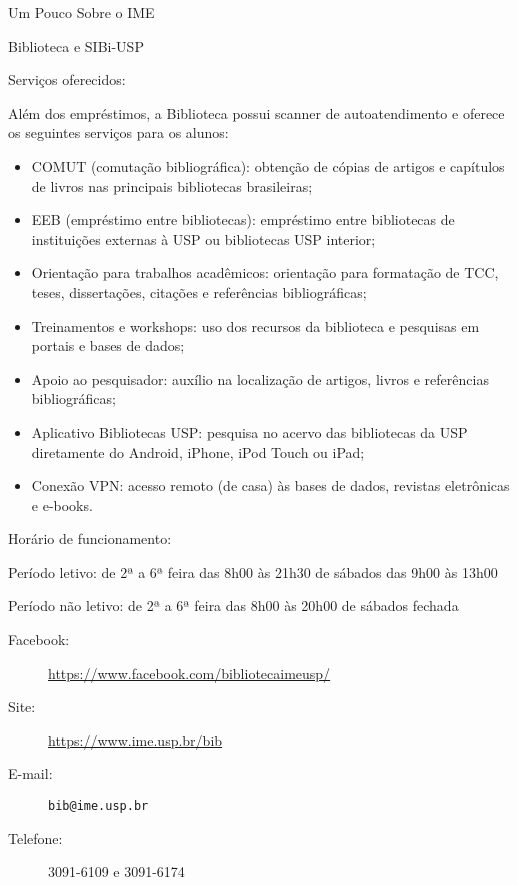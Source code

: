 \begin{secao}{Um Pouco Sobre o IME}
\begin{subsecao}{Biblioteca e SIBi-USP}
\begin{subsubsecao}{Serviços oferecidos:}

Além dos empréstimos, a Biblioteca possui scanner de autoatendimento e oferece os seguintes serviços para os alunos:
\begin{itemize}
    \item COMUT (comutação bibliográfica): obtenção de cópias de artigos e capítulos de livros nas principais bibliotecas brasileiras; 
    \item EEB (empréstimo entre bibliotecas): empréstimo entre bibliotecas de instituições externas à USP ou bibliotecas USP interior;
    \item Orientação para trabalhos acadêmicos: orientação para formatação de TCC, teses, dissertações, citações e referências bibliográficas;
    \item Treinamentos e workshops: uso dos recursos da biblioteca e pesquisas em portais e bases de dados;
    \item Apoio ao pesquisador: auxílio na localização de artigos, livros e referências bibliográficas;
    \item Aplicativo Bibliotecas USP: pesquisa no acervo das bibliotecas da USP diretamente do Android, iPhone, iPod Touch ou iPad; 
    \item Conexão VPN: acesso remoto (de casa) às bases de dados, revistas eletrônicas e e-books.
\end{itemize}
\end{subsubsecao}

\begin{subsubsecao}{Horário de funcionamento:}

Período letivo: de 2ª a 6ª feira das 8h00 às 21h30 \newline
\phantom{Período letivo: }de sábados das 9h00 às 13h00

Período não letivo: de 2ª a 6ª feira das 8h00 às 20h00 \newline
\phantom{Período não letivo: }de sábados fechada 
\end{subsubsecao}
\begin{description}
  \item[Facebook:] \url{https://www.facebook.com/bibliotecaimeusp/}
  \item[Site:] \url{https://www.ime.usp.br/bib}
  \item[E-mail:] \texttt{bib@ime.usp.br}
  \item[Telefone:] 3091-6109 e 3091-6174
\end{description}

\end{subsecao}
\end{secao}
